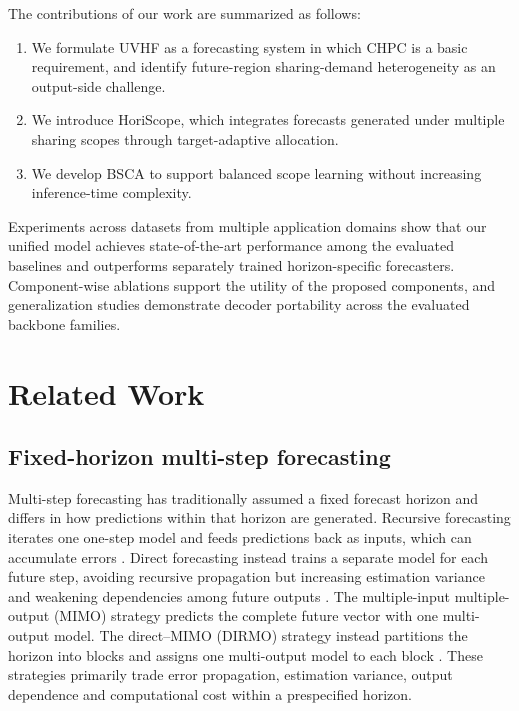 \documentclass[final,3p,times]{elsarticle}
\begin{document}
The contributions of our work are summarized as follows:

\begin{enumerate}
\item We formulate UVHF as a forecasting system in which CHPC is a basic requirement, and identify future-region sharing-demand heterogeneity as an output-side challenge.
\item We introduce HoriScope, which integrates forecasts generated under multiple sharing scopes through target-adaptive allocation.
\item We develop BSCA to support balanced scope learning without increasing inference-time complexity.
\end{enumerate}

Experiments across datasets from multiple application domains show that our unified model achieves state-of-the-art performance among the evaluated baselines and outperforms separately trained horizon-specific forecasters. Component-wise ablations support the utility of the proposed components, and generalization studies demonstrate decoder portability across the evaluated backbone families.

\section{Related Work}
\label{sec:related-work}


\subsection{Fixed-horizon multi-step forecasting}


Multi-step forecasting has traditionally assumed a fixed forecast horizon and differs in how predictions within that horizon are generated. Recursive forecasting iterates one one-step model and feeds predictions back as inputs, which can accumulate errors \citep{taieb2014boosting}. Direct forecasting instead trains a separate model for each future step, avoiding recursive propagation but increasing estimation variance and weakening dependencies among future outputs \citep{taieb2014boosting}. The multiple-input multiple-output (MIMO) strategy predicts the complete future vector with one multi-output model. The direct--MIMO (DIRMO) strategy instead partitions the horizon into blocks and assigns one multi-output model to each block \citep{bontempi2008mimo,taieb2012review,green2025stratify}. These strategies primarily trade error propagation, estimation variance, output dependence and computational cost within a prespecified horizon.
\end{document}
